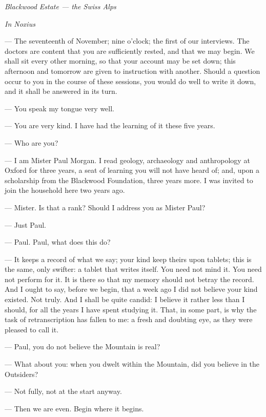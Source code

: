 \typeprologue

\begin{center}\small\itshape Blackwood Estate --- the Swiss Alps\end{center}

\begin{room}

\textit{In Noxius}

--- The seventeenth of November; nine o'clock; the first of our interviews. The doctors are content that you are sufficiently rested, and that we may begin. We shall sit every other morning, so that your account may be set down; this afternoon and tomorrow are given to instruction with another. Should a question occur to you in the course of these sessions, you would do well to write it down, and it shall be answered in its turn.\par

--- You speak my tongue very well.\par

--- You are very kind. I have had the learning of it these five years.\par

--- Who are you?\par

--- I am Mister Paul Morgan. I read geology, archaeology and anthropology at Oxford for three years, a seat of learning you will not have heard of; and, upon a scholarship from the Blackwood Foundation, three years more. I was invited to join the household here two years ago.\par

--- Mister. Is that a rank? Should I address you as Mister Paul?\par

--- Just Paul.\par

--- Paul. Paul, what does this do?\par

--- It keeps a record of what we say; your kind keep theirs upon tablets; this is the same, only swifter: a tablet that writes itself. You need not mind it. You need not perform for it. It is there so that my memory should not betray the record. And I ought to say, before we begin, that a week ago I did not believe your kind existed. Not truly. And I shall be quite candid: I believe it rather less than I should, for all the years I have spent studying it. That, in some part, is why the task of retranscription has fallen to me: a fresh and doubting eye, as they were pleased to call it.\par

--- Paul, you do not believe the Mountain is real?\par

--- What about you: when you dwelt within the Mountain, did you believe in the Outsiders?\par

--- Not fully, not at the start anyway.\par

--- Then we are even. Begin where it begins.\par

\end{room}
